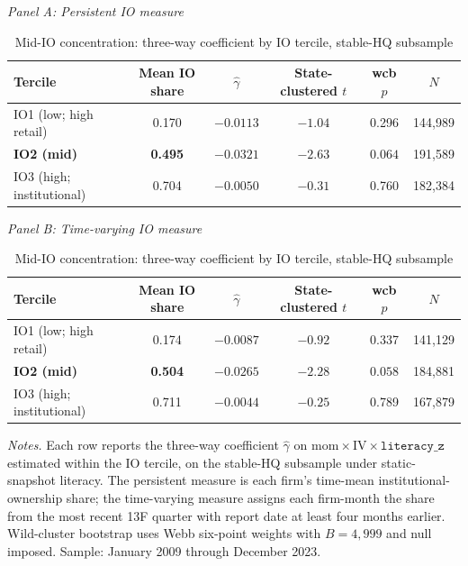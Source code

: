\begin{table}[t]
\centering
\caption{Mid-IO concentration: three-way coefficient by IO tercile, stable-HQ subsample}
\label{tab:headline}
\footnotesize
\begin{minipage}{\textwidth}
\centering
\textit{Panel A: Persistent IO measure}\\[2pt]
\begin{tabular}{lccccc}
\toprule
Tercile & Mean IO share & $\hat\gamma$ & State-clustered $t$ & wcb $p$ & $N$ \\
\midrule
IO1 (low; high retail)        & 0.170 & $-0.0113$ & $-1.04$ & 0.296 & 144,989 \\
\textbf{IO2 (mid)}            & \textbf{0.495} & $\mathbf{-0.0321}$ & $\mathbf{-2.63}$ & $\mathbf{0.064}$ & 191,589 \\
IO3 (high; institutional)     & 0.704 & $-0.0050$ & $-0.31$ & 0.760 & 182,384 \\
\bottomrule
\end{tabular}

\medskip
\textit{Panel B: Time-varying IO measure}\\[2pt]
\begin{tabular}{lccccc}
\toprule
Tercile & Mean IO share & $\hat\gamma$ & State-clustered $t$ & wcb $p$ & $N$ \\
\midrule
IO1 (low; high retail)        & 0.174 & $-0.0087$ & $-0.92$ & 0.337 & 141,129 \\
\textbf{IO2 (mid)}            & \textbf{0.504} & $\mathbf{-0.0265}$ & $\mathbf{-2.28}$ & $\mathbf{0.058}$ & 184,881 \\
IO3 (high; institutional)     & 0.711 & $-0.0044$ & $-0.25$ & 0.789 & 167,879 \\
\bottomrule
\end{tabular}
\end{minipage}

\medskip
{\footnotesize\textit{Notes.} Each row reports the three-way coefficient $\hat\gamma$ on $\mathrm{mom}\times\mathrm{IV}\times\mathtt{literacy\_z}$ estimated within the IO tercile, on the stable-HQ subsample under static-snapshot literacy. The persistent measure is each firm's time-mean institutional-ownership share; the time-varying measure assigns each firm-month the share from the most recent 13F quarter with report date at least four months earlier. Wild-cluster bootstrap uses Webb six-point weights \citep{cameronGelbachMiller2008} with $B = 4{,}999$ and null imposed. Sample: January 2009 through December 2023.}
\end{table}

